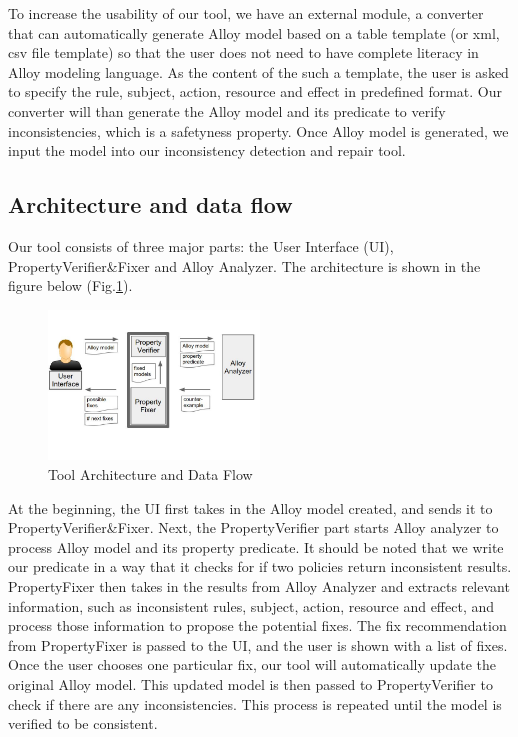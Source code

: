 \documentclass{acm_proc_article-sp}
\begin{document}
To increase the usability of our tool, we have an external module, a converter that can automatically generate Alloy model based on a table template (or xml, csv file template) so that the user does not need to have complete literacy in Alloy modeling language. As the content of the such a template, the user is asked to specify the rule, subject, action, resource and effect in predefined format. Our converter will than generate the Alloy model and its predicate to verify inconsistencies, which is a safetyness property. Once Alloy model is generated, we input the model into our inconsistency detection and repair tool. 

\subsection{Architecture and data flow}

Our tool consists of three major parts: the User Interface (UI), PropertyVerifier\&Fixer and Alloy Analyzer. The architecture is shown in the figure below (Fig.\ref{fig:Architecture}).\\

\begin{figure}[h]
\includegraphics[width=0.5\textwidth]{DataFlow.JPG}
\caption{Tool Architecture and Data Flow}    
  \label{fig:Architecture}
\end{figure}

At the beginning, the UI first takes in the Alloy model created, and sends it to PropertyVerifier\&Fixer. Next, the PropertyVerifier part starts Alloy analyzer to process Alloy model and its property predicate. It should be noted that we write our predicate in a way that it checks for if two policies return inconsistent results. PropertyFixer then takes in the results from Alloy Analyzer and extracts relevant information, such as inconsistent rules, subject, action, resource and effect, and process those information to propose the potential fixes. The fix recommendation from PropertyFixer is passed to the UI, and the user is shown with a list of fixes. Once the user chooses one particular fix, our tool will automatically update the original Alloy model. This updated model is then passed to PropertyVerifier to check if there are any inconsistencies. This process is repeated until the model is verified to be consistent.
\end{document}
